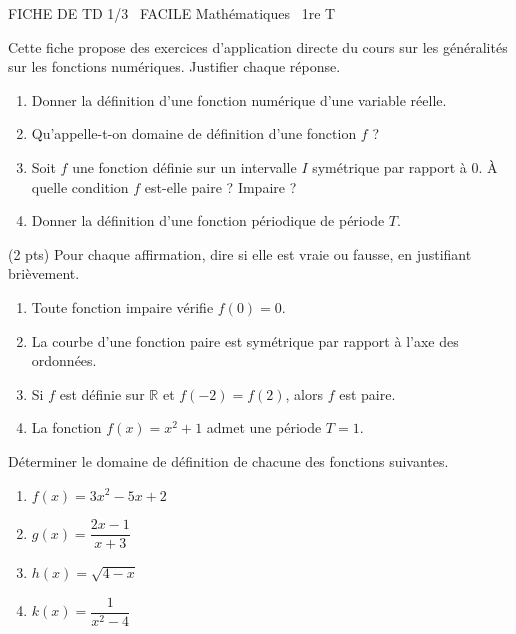 \documentclass[11pt]{article}
\begin{document}
\begin{tcolorbox}[enhanced,colback=popink,colframe=popink,arc=10pt,boxrule=0pt,left=12pt,right=12pt,top=9pt,bottom=9pt]
{\color{white}\popxbold\small FICHE DE TD 1/3 \textbullet\ FACILE \hfill Mathématiques \textbullet\ 1re T\par}
\end{tcolorbox}
\vspace{4pt}
Cette fiche propose des exercices d'application directe du cours sur les généralités sur les fonctions numériques. Justifier chaque réponse.

\begin{exercice}
\begin{enumerate}
\item Donner la définition d'une fonction numérique d'une variable réelle.
\item Qu'appelle-t-on domaine de définition d'une fonction $f$ ?
\item Soit $f$ une fonction définie sur un intervalle $I$ symétrique par rapport à $0$. À quelle condition $f$ est-elle paire ? Impaire ?
\item Donner la définition d'une fonction périodique de période $T$.
\end{enumerate}
\end{exercice}

\begin{exercice} \hfill (2 pts)
Pour chaque affirmation, dire si elle est vraie ou fausse, en justifiant brièvement.
\begin{enumerate}
\item Toute fonction impaire vérifie $f(0)=0$.
\item La courbe d'une fonction paire est symétrique par rapport à l'axe des ordonnées.
\item Si $f$ est définie sur $\mathbb{R}$ et $f(-2)=f(2)$, alors $f$ est paire.
\item La fonction $f(x)=x^2+1$ admet une période $T=1$.
\end{enumerate}
\end{exercice}

\begin{exercice}
Déterminer le domaine de définition de chacune des fonctions suivantes.
\begin{enumerate}
\item $f(x)=3x^2-5x+2$
\item $g(x)=\dfrac{2x-1}{x+3}$
\item $h(x)=\sqrt{4-x}$
\item $k(x)=\dfrac{1}{x^2-4}$
\end{enumerate}
\end{exercice}
\end{document}
